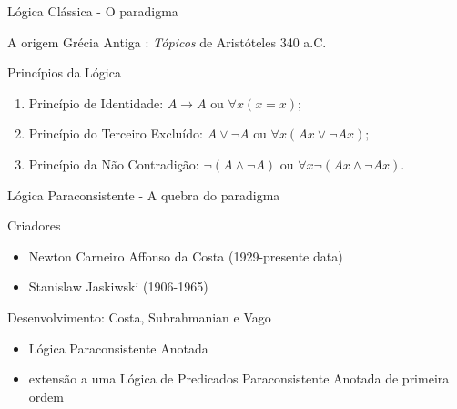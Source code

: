 \begin{frame}{Lógica Clássica \small - O paradigma}
\begin{block}{A origem \tiny \cite{JoaoInacio}}
Grécia Antiga : \emph{Tópicos} de Aristóteles  340 a.C.
\end{block}
\begin{block}{Princípios da Lógica \tiny \cite{JoaoInacio}}

\begin{enumerate}
\item Princípio de Identidade: 
    \begin{math}
	A \rightarrow A 
	\textrm{ ou } 
	\forall x(x=x);
    \end{math}

\item Princípio do Terceiro Excluído:
    \begin{math}
	A \vee \neg A
	\textrm{ ou }
	\forall x(Ax \vee \neg Ax);
    \end{math}

\item Princípio da Não Contradição: 
    \begin{math}
	\neg (A \wedge \neg A)
	\textrm{ ou }
	\forall x\neg(Ax \wedge \neg Ax).
    \end{math}

\end{enumerate}

\end{block}
\end{frame}





\begin{frame}{Lógica Paraconsistente - \small A quebra do paradigma}

\begin{block}{Criadores \tiny \cite{DecioKrause}}
\begin{itemize}
\item Newton Carneiro Affonso da Costa (1929-presente data)
\item Stanislaw Jaskiwski (1906-1965)
\end{itemize}
\end{block}

\begin{block}{Desenvolvimento: Costa, Subrahmanian e Vago \tiny \cite{DecioKrause}}
\begin{itemize}
\item Lógica Paraconsistente Anotada
\item extensão a uma Lógica de Predicados Paraconsistente Anotada de primeira ordem 
\end{itemize}
\end{block}

\end{frame}





